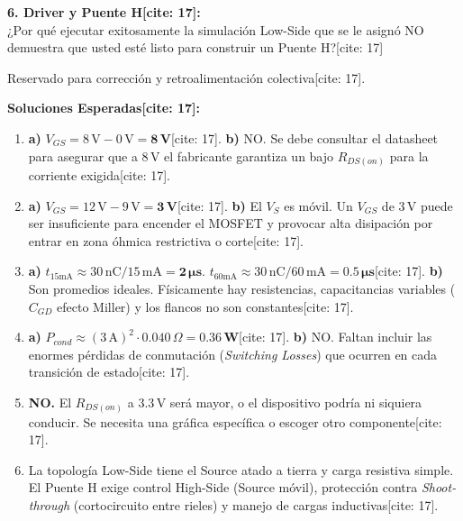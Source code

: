 \documentclass[11pt, a4paper]{article}
\begin{document}
\vspace{0.4cm}
\textbf{6. Driver y Puente H[cite: 17]:} \\
¿Por qué ejecutar exitosamente la simulación Low-Side que se le asignó NO demuestra que usted esté listo para construir un Puente H?[cite: 17] \hrulefill

\newpage
\begin{tcolorbox}[colback=red!5, colframe=red!70!black, title=\textbf{Clave Docente: Soluciones a los Ejercicios de Transferencia[cite: 17]}]
    Reservado para corrección y retroalimentación colectiva[cite: 17].
\end{tcolorbox}

\textbf{Soluciones Esperadas[cite: 17]:}
\begin{enumerate}
    \item \textbf{a)} $V_{GS} = 8\,\text{V} - 0\,\text{V} = \mathbf{8\,\text{V}}$[cite: 17]. \textbf{b)} NO. Se debe consultar el datasheet para asegurar que a $8\,\text{V}$ el fabricante garantiza un bajo $R_{DS(on)}$ para la corriente exigida[cite: 17].
    \item \textbf{a)} $V_{GS} = 12\,\text{V} - 9\,\text{V} = \mathbf{3\,\text{V}}$[cite: 17]. \textbf{b)} El $V_S$ es móvil. Un $V_{GS}$ de $3\,\text{V}$ puede ser insuficiente para encender el MOSFET y provocar alta disipación por entrar en zona óhmica restrictiva o corte[cite: 17].
    \item \textbf{a)} $t_{15\text{mA}} \approx 30\,\text{nC} / 15\,\text{mA} = \mathbf{2\,\mu\text{s}}$. $t_{60\text{mA}} \approx 30\,\text{nC} / 60\,\text{mA} = \mathbf{0.5\,\mu\text{s}}$[cite: 17]. \textbf{b)} Son promedios ideales. Físicamente hay resistencias, capacitancias variables ($C_{GD}$ efecto Miller) y los flancos no son constantes[cite: 17].
    \item \textbf{a)} $P_{cond} \approx (3\,\text{A})^2 \cdot 0.040\,\Omega = \mathbf{0.36\,\text{W}}$[cite: 17]. \textbf{b)} NO. Faltan incluir las enormes pérdidas de conmutación (\textit{Switching Losses}) que ocurren en cada transición de estado[cite: 17].
    \item \textbf{NO.} El $R_{DS(on)}$ a $3.3\,\text{V}$ será mayor, o el dispositivo podría ni siquiera conducir. Se necesita una gráfica específica o escoger otro componente[cite: 17].
    \item La topología Low-Side tiene el Source atado a tierra y carga resistiva simple. El Puente H exige control High-Side (Source móvil), protección contra \textit{Shoot-through} (cortocircuito entre rieles) y manejo de cargas inductivas[cite: 17].
\end{enumerate}
\end{document}
